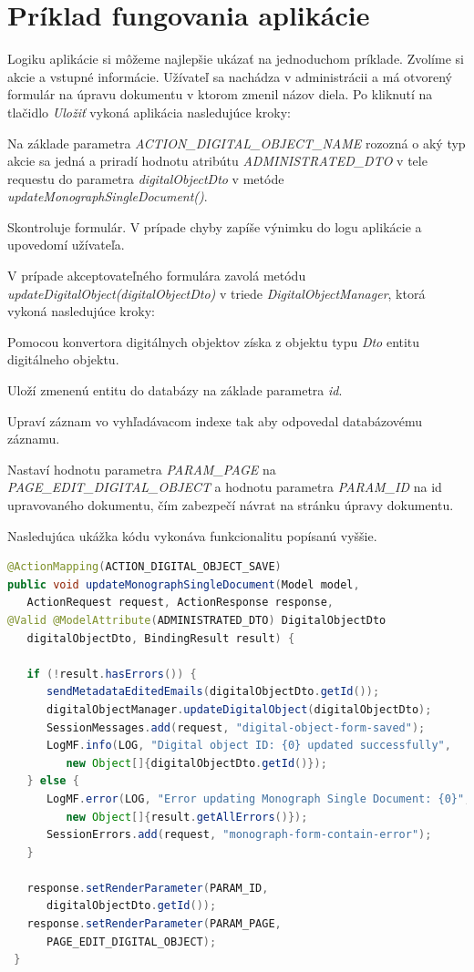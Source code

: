 \documentclass[
  print, %
  table,   %
  lof,     %
  nolot,     %
]{fithesis3}
\begin{document}
\section{Príklad fungovania aplikácie}
Logiku aplikácie si môžeme najlepšie ukázať na jednoduchom príklade. Zvolíme si akcie a vstupné informácie.  Užívateľ sa nachádza v administrácii a má otvorený formulár na úpravu dokumentu v ktorom zmenil názov diela. Po kliknutí na tlačidlo \textit{Uložiť} vykoná aplikácia nasledujúce kroky:
\begin{compactenum}
	\item Na základe parametra \textit{ACTION\_DIGITAL\_OBJECT\_NAME} rozozná o aký typ akcie sa jedná a priradí hodnotu atribútu \textit{ADMINISTRATED\_DTO} v tele requestu do parametra \textit{digitalObjectDto} v metóde \textit{updateMonographSingleDocument()}.
	\item Skontroluje formulár. V prípade chyby zapíše výnimku do logu aplikácie a upovedomí užívateľa.
	\item V prípade akceptovateľného formulára zavolá metódu \textit{updateDigitalObject(digitalObjectDto)} v triede \textit{DigitalObjectManager}, ktorá vykoná nasledujúce kroky:
	\begin{compactenum}
		\item Pomocou konvertora digitálnych objektov získa z objektu typu \textit{Dto} entitu digitálneho objektu.
		\item Uloží zmenenú entitu do databázy na základe parametra \textit{id}.
		\item Upraví záznam vo vyhľadávacom indexe tak aby odpovedal databázovému záznamu.		
	\end{compactenum} 
	\item Nastaví hodnotu parametra \textit{PARAM\_PAGE} na \textit{PAGE\_EDIT\_DIGITAL\_OBJECT} a hodnotu parametra \textit{PARAM\_ID} na id upravovaného dokumentu, čím zabezpečí návrat na stránku úpravy dokumentu.	 
\end{compactenum}
\bigskip Nasledujúca ukážka kódu vykonáva funkcionalitu popísanú vyššie.
\begin{lstlisting}[language=Java, basicstyle=\small, style=java-nice]
@ActionMapping(ACTION_DIGITAL_OBJECT_SAVE)
public void updateMonographSingleDocument(Model model, 
   ActionRequest request, ActionResponse response,
@Valid @ModelAttribute(ADMINISTRATED_DTO) DigitalObjectDto 
   digitalObjectDto, BindingResult result) {

   if (!result.hasErrors()) {
      sendMetadataEditedEmails(digitalObjectDto.getId());
      digitalObjectManager.updateDigitalObject(digitalObjectDto);
      SessionMessages.add(request, "digital-object-form-saved");
      LogMF.info(LOG, "Digital object ID: {0} updated successfully", 
         new Object[]{digitalObjectDto.getId()});
   } else {
      LogMF.error(LOG, "Error updating Monograph Single Document: {0}",
         new Object[]{result.getAllErrors()});
      SessionErrors.add(request, "monograph-form-contain-error");
   }
    
   response.setRenderParameter(PARAM_ID, 
      digitalObjectDto.getId());
   response.setRenderParameter(PARAM_PAGE, 
      PAGE_EDIT_DIGITAL_OBJECT);
 }
\end{lstlisting}
\end{document}
